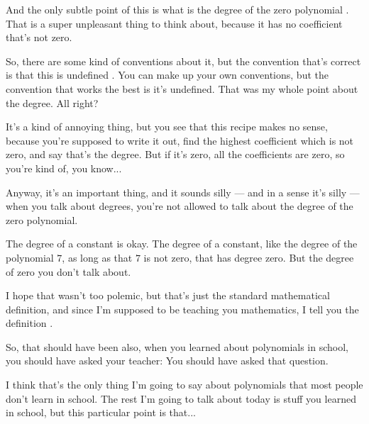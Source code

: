 \begin{speech}[00:24:30 - 00:26:17]
And the only subtle point of this is what is the degree of the zero polynomial . That is a super unpleasant thing to think about, because it has no coefficient that's not zero.

So, there are some kind of conventions about it, but the convention that's correct is that this is undefined . You can make up your own conventions, but the convention that works the best is it's undefined. That was my whole point about the degree. All right?

It's a kind of annoying thing, but you see that this recipe makes no sense, because you're supposed to write it out, find the highest coefficient which is not zero, and say that's the degree. But if it's zero, all the coefficients are zero, so you're kind of, you know...

Anyway, it's an important thing, and it sounds silly --- and in a sense it's silly --- when you talk about degrees, you're not allowed to talk about the degree of the zero polynomial.

The degree of a constant is okay. The degree of a constant, like the degree of the polynomial $7$, as long as that $7$ is not zero, that has degree zero. But the degree of zero you don't talk about.

I hope that wasn't too polemic, but that's just the standard mathematical definition, and since I'm supposed to be teaching you mathematics, I tell you the definition .

So, that should have been also, when you learned about polynomials in school, you should have asked your teacher:  You should have asked that question.

I think that's the only thing I'm going to say about polynomials that most people don't learn in school. The rest I'm going to talk about today is stuff you learned in school, but this particular point is that...
\end{speech}


